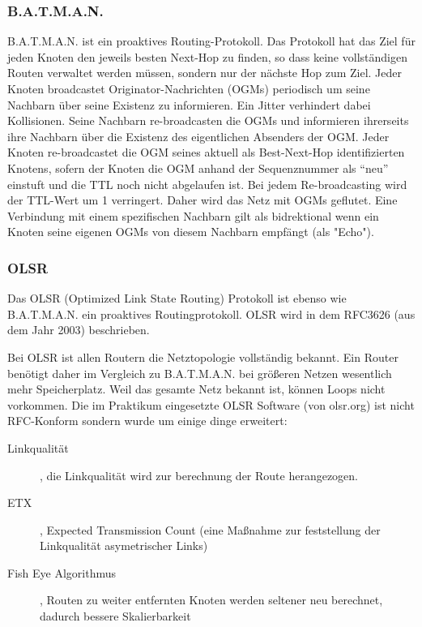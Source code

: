 \documentclass[a4paper,10pt]{article}
\begin{document}

\subsubsection*{B.A.T.M.A.N.}

B.A.T.M.A.N. ist ein proaktives Routing-Protokoll.
Das Protokoll hat das Ziel für jeden Knoten den jeweils besten Next-Hop zu finden, so dass keine vollständigen Routen verwaltet werden müssen, sondern nur der nächste Hop zum Ziel.
Jeder Knoten broadcastet Originator-Nachrichten (OGMs) periodisch um seine Nachbarn über seine Existenz zu informieren.
Ein Jitter verhindert dabei Kollisionen.
Seine Nachbarn re-broadcasten die OGMs und informieren ihrerseits ihre Nachbarn über die Existenz des eigentlichen Absenders der OGM.
Jeder Knoten re-broadcastet die OGM seines aktuell als Best-Next-Hop identifizierten Knotens, sofern der Knoten die OGM anhand der Sequenznummer als "`neu"' einstuft und die TTL noch nicht abgelaufen ist.
Bei jedem Re-broadcasting wird der TTL-Wert um 1 verringert.
Daher wird das Netz mit OGMs geflutet.
Eine Verbindung mit einem spezifischen Nachbarn gilt als bidrektional wenn ein Knoten seine eigenen OGMs von diesem Nachbarn empfängt (als "Echo").


\subsubsection*{OLSR}
Das OLSR (Optimized Link State Routing) Protokoll ist ebenso wie B.A.T.M.A.N. ein proaktives Routingprotokoll.
OLSR wird in dem RFC3626 (aus dem Jahr 2003) beschrieben.

Bei OLSR ist allen Routern die Netztopologie vollständig bekannt. Ein Router benötigt daher im Vergleich zu B.A.T.M.A.N. bei größeren
Netzen wesentlich mehr Speicherplatz.
Weil das gesamte Netz bekannt ist, können Loops nicht vorkommen.
Die im Praktikum eingesetzte OLSR Software (von olsr.org) ist nicht RFC-Konform sondern wurde um einige dinge erweitert:

\begin{description}
\item[Linkqualität], die Linkqualität wird zur berechnung der Route herangezogen.
\item[ETX], Expected Transmission Count (eine Maßnahme zur feststellung der Linkqualität asymetrischer Links)
\item[Fish Eye Algorithmus], Routen zu weiter entfernten Knoten werden seltener neu berechnet, dadurch bessere Skalierbarkeit
\end{description}
\end{document}
